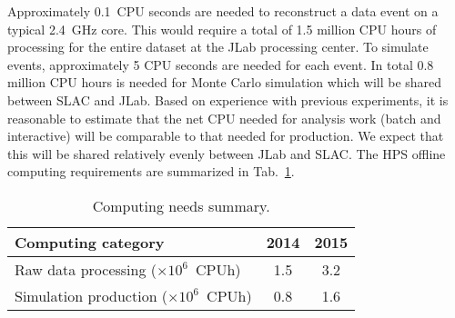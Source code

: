 Approximately 0.1~CPU seconds are needed to reconstruct a data event on 
a typical 2.4~GHz core. This would require a total of 1.5 million CPU hours of processing for the 
entire dataset at the JLab processing center.  To simulate events, approximately 5 CPU seconds 
are needed for each event. In total 0.8 million CPU hours is needed for Monte Carlo 
simulation which will be shared between SLAC and JLab. 
Based on experience with previous experiments, it is reasonable to estimate that the net CPU needed for 
analysis work (batch and interactive) will be comparable to that needed for production. We expect 
that this will be shared relatively evenly between JLab and SLAC. The HPS offline computing requirements 
are summarized in Tab.~\ref{tab:computing}.
\begin{table}[tbp]
\centering
\begin{tabular}{|l|c|c|}
\hline
Computing category & 2014& 2015 \\
\hline
Raw data processing ($\times 10^{6}$~CPUh)  & 1.5 & 3.2 \\
Simulation production ($\times 10^{6}$~CPUh) & 0.8 & 1.6 \\
\hline
\end{tabular}
\caption{{\small Computing needs summary.}}
\label{tab:computing}
\end{table}

